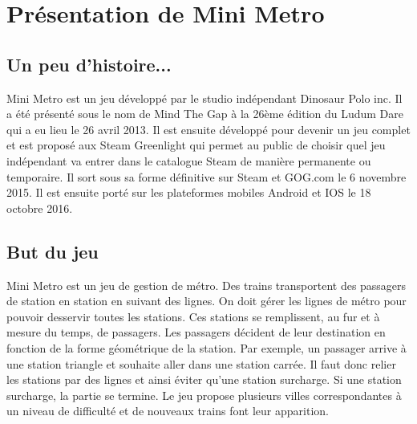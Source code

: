 \documentclass[report, backcover, french, nodocumentinfo]{upmethodology-document}
\begin{document}
	\upmdocumentsummary{}
	\upmdocumentauthors{}
	\upmdocumentinformedpeople{}
	\upmpublicationpage{}

	\tableofcontents{}
	\listoffigures{}

	\newpage{}
	\chapter{Présentation de Mini Metro}
		\section{Un peu d'histoire...}
			\p{}
				Mini Metro est un jeu développé par le studio indépendant Dinosaur Polo inc. Il a été présenté sous le nom de Mind The Gap à la 26ème édition du Ludum Dare qui a eu lieu le 26 avril 2013. Il est ensuite développé pour devenir un jeu complet et est proposé aux Steam Greenlight qui permet au public de choisir quel jeu indépendant va entrer dans le catalogue Steam de manière permanente ou temporaire. Il sort sous sa forme définitive sur Steam et GOG.com le 6 novembre 2015. Il est ensuite porté sur les plateformes mobiles Android et IOS le 18 octobre 2016.
		\section{But du jeu}
			\p{}
				Mini Metro est un jeu de gestion de métro. Des trains transportent des passagers de station en station en suivant des lignes. On doit gérer les lignes de métro pour pouvoir desservir toutes les stations. Ces stations se remplissent, au fur et à mesure du temps, de passagers. Les passagers décident de leur destination en fonction de la forme géométrique de la station. Par exemple, un passager arrive à une station triangle et souhaite aller dans une station carrée. Il faut donc relier les stations par des lignes et ainsi éviter qu’une station surcharge. Si une station surcharge, la partie se termine.
			\p{}
				Le jeu propose plusieurs villes correspondantes à un niveau de difficulté et de nouveaux trains font leur apparition.
\end{document}
